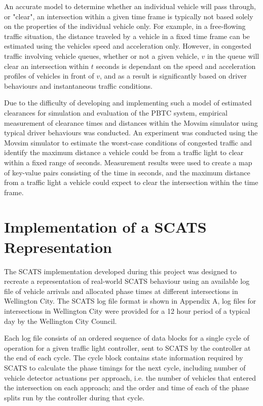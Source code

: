 An accurate model to determine whether an individual vehicle will pass through, or "clear", an intersection within a given time frame is typically not based solely on the properties of the individual vehicle only. For example, in a free-flowing traffic situation, the distance traveled by a vehicle in a fixed time frame can be estimated using the vehicles speed and acceleration only. However, in congested traffic involving vehicle queues, whether or not a given vehicle, $v$ in the queue will clear an intersection within $t$ seconds is dependant on the speed and acceleration profiles of vehicles in front of $v$, and as a result is significantly based on driver behaviours and instantaneous traffic conditions.

Due to the difficulty of developing and implementing such a model of estimated clearances for simulation and evaluation of the PBTC system, empirical measurement of clearance times and distances within the Movsim simulator using typical driver behaviours was conducted. An experiment was conducted using the Movsim simulator to estimate the worst-case conditions of congested traffic and identify the maximum distance a vehicle could be from a traffic light to clear within a fixed range of seconds. Measurement results were used to create a map of key-value pairs consisting of the time in seconds, and the maximum distance from a traffic light a vehicle could expect to clear the intersection within the time frame.  

\section{Implementation of a SCATS Representation}

The SCATS implementation developed during this project was designed to recreate a representation of real-world SCATS behaviour using an available log file of vehicle arrivals and allocated phase times at different intersections in Wellington City. The SCATS log file format is shown in Appendix A, log files for intersections in Wellington City were provided for a 12 hour period of a typical day by the Wellington City Council.

Each log file consists of an ordered sequence of data blocks for a single cycle of operation for a given traffic light controller, sent to SCATS by the controller at the end of each cycle. The cycle block contains state information required by SCATS to calculate the phase timings for the next cycle, including number of vehicle detector actuations per approach, i.e. the number of vehicles that entered the intersection on each approach; and the order and time of each of the phase splits run by the controller during that cycle. 

